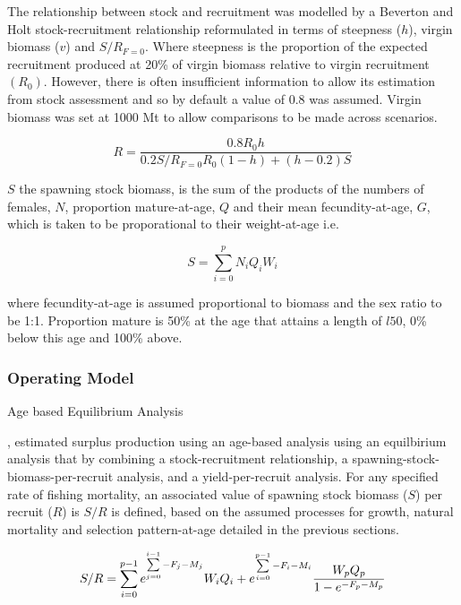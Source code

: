 \documentclass[preprint,12pt]{elsarticle}
\begin{document}
The relationship between stock and recruitment was modelled by a Beverton and Holt stock-recruitment relationship \cite{beverton1993dynamics} reformulated in terms of steepness ($h$), virgin biomass ($v$) and $S/R_{F=0}$. Where steepness is the proportion of the expected recruitment produced at 20\% of virgin biomass relative to virgin recruitment  $(R_0)$. However, there is often insufficient information to allow its estimation from stock assessment \cite{pepin2015reconsidering} and so by default a value of 0.8 was assumed. Virgin biomass was set at 1000 Mt to allow comparisons to be made across scenarios.

\begin{equation}
R=\frac{0.8R_0h}{0.2S/R_{F=0}R_0(1-h)+(h-0.2)S}
\end{equation} 

$S$ the spawning stock biomass, is the sum of the products of the numbers of females, $N$, proportion mature-at-age, $Q$ and their mean fecundity-at-age, $G$, which is taken to be proporational to their weight-at-age i.e. 

\begin{equation} S = \sum\limits_{i=0}^{p} {N_iQ_iW_i} \end{equation}

where fecundity-at-age is assumed proportional to biomass and the sex ratio to be 1:1. Proportion mature is 50\% at the age that attains a length of $l50$, 0\% below this age and 100\% above. 


\subsubsection{Operating Model}

Age based Equilibrium Analysis 

\cite{sissenwine1987alternative}, estimated surplus production using an age-based analysis using an equilbirium analysis that by combining a stock-recruitment relationship, a spawning-stock-biomass-per-recruit analysis, and a yield-per-recruit analysis. For any specified rate of fishing mortality, an associated value of spawning stock biomass ($S$) per recruit ($R$) is $S/R$ is defined, based on the assumed processes for growth, natural mortality and selection pattern-at-age detailed in the previous sections.

\begin{equation}
S/R=\sum\limits_{i=0}^{p-1} {e^{\sum\limits_{j=0}^{i-1} {-F_j-M_j}}} W_i Q_i + e^{\sum\limits_{i=0}^{p-1} {-F_i-M_i}} \frac{W_p Q_p}{1-e^{-F_p-M_p}}\\
\end{equation} 
\end{document}
